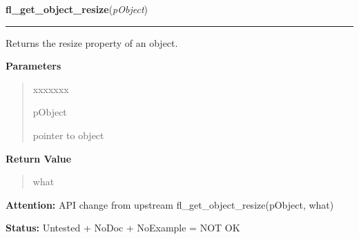 \hspace{.8\funcindent}\begin{boxedminipage}{\funcwidth}

    \raggedright \textbf{fl\_get\_object\_resize}(\textit{pObject})

    \vspace{-1.5ex}

    \rule{\textwidth}{0.5\fboxrule}
\setlength{\parskip}{2ex}
    Returns the resize property of an object.

\setlength{\parskip}{1ex}
      \textbf{Parameters}
      \vspace{-1ex}

      \begin{quote}
        \begin{Ventry}{xxxxxxx}

          \item[pObject]

          pointer to object

        \end{Ventry}

      \end{quote}

      \textbf{Return Value}
    \vspace{-1ex}

      \begin{quote}
      what

      \end{quote}

\textbf{Attention:} API change from upstream fl\_get\_object\_resize(pObject, what)



\textbf{Status:} Untested + NoDoc + NoExample = NOT OK



    \end{boxedminipage}

    \label{xformslib:library:fl_set_object_gravity}

    \vspace{0.5ex}

